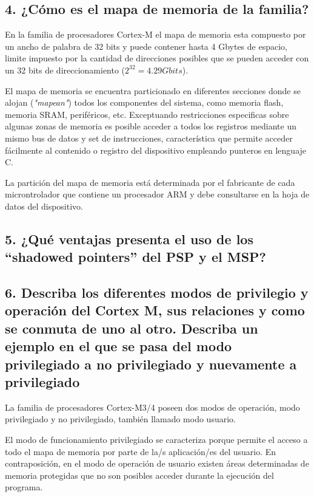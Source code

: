 \documentclass[10pt,a4paper,twoside,spanish]{article}	%
\begin{document}
\subsection*{4. ¿Cómo es el mapa de memoria de la familia?}

En la familia de procesadores Cortex-M el mapa de memoria esta compuesto por un ancho de palabra de 32 bits y puede contener hasta 4 Gbytes de espacio, limite impuesto por la cantidad de direcciones posibles que se pueden acceder con un 32 bits de direccionamiento ($2^{32}=4.29 Gbits$).

El mapa de memoria se encuentra particionado en diferentes secciones donde se alojan (\textit{"mapean"}) todos los componentes del sistema, como memoria flash, memoria SRAM, periféricos, etc. Exceptuando restricciones especificas sobre algunas zonas de memoria es posible acceder a todos los registros mediante un mismo bus de datos y set de instrucciones, característica que permite acceder fácilmente al contenido o registro del dispositivo empleando punteros en lenguaje C.  

La partición del mapa de memoria está determinada por el fabricante de cada microntrolador que contiene un procesador ARM y debe consultarse en la hoja de datos del dispositivo.

\subsection*{5. ¿Qué ventajas presenta el uso de los “shadowed pointers” del PSP y el MSP?}

\subsection*{6. Describa los diferentes modos de privilegio y operación del Cortex M, sus relaciones y como se conmuta de uno al otro. Describa un ejemplo en el que se pasa del modo privilegiado a no privilegiado y nuevamente a privilegiado}

La familia de procesadores Cortex-M3/4 poseen dos modos de operación, modo privilegiado y no privilegiado, también llamado modo usuario.

El modo de funcionamiento privilegiado se caracteriza porque permite el acceso a todo el mapa de memoria por parte de la/s aplicación/es del usuario. En contraposición, en el modo de operación de usuario existen áreas determinadas de memoria protegidas que no son posibles acceder durante la ejecución del programa.
\end{document}
